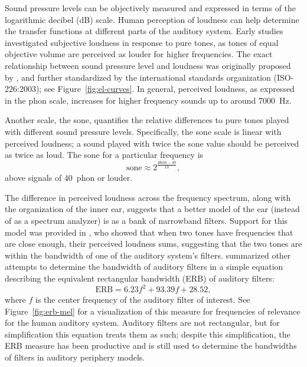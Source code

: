 Sound pressure levels can be objectively measured
and expressed in terms of the logarithmic
decibel (dB) scale.
Human perception of loudness can help
determine the transfer functions
at different parts of the auditory system.
Early studies investigated
subjective loudness in response
to pure tones,
as tones of equal objective volume
are perceived as louder for higher frequencies.
The exact relationship between
sound pressure level and
loudness was originally proposed
by \citet{fletcher1933},
and further standardized
by the international standards organization
(ISO-226:2003);
see Figure~\ref{fig:el-curves}.
In general, perceived loudness,
as expressed in the phon scale,
increases for higher frequency sounds
up to around 7000~Hz.


Another scale, the sone,
quantifies the relative differences
to pure tones played with
different sound pressure levels.
Specifically, the sone scale
is linear with perceived loudness;
a sound played with twice the sone value
should be perceived as twice as loud.
The sone for a particular frequency is
\begin{equation*}
  \text{sone} \approx 2^{\frac{\text{phon} - 40}{10}},
\end{equation*}
above signals of 40~phon or louder.

The difference in perceived loudness
across the frequency spectrum,
along with the organization
of the inner ear,
suggests that a better model
of the ear (instead of as a spectrum analyzer)
is as a bank of narrowband filters.
Support for this model was provided
in \citet{zwicker1957},
who showed that when two tones
have frequencies that are close enough,
their perceived loudness sums,
suggesting that the two tones
are within the bandwidth of one of the
auditory system's filters.
\citet{moore1983}
summarized other attempts to
determine the bandwidth
of auditory filters
in a simple equation
describing the equivalent
rectangular bandwidth (ERB)
of auditory filters:
\begin{equation}
  \text{ERB} = 6.23 f^2 + 93.39 f + 28.52,
\end{equation}
where $f$ is the center frequency
of the auditory filter of interest.
See Figure~\ref{fig:erb-mel} for a visualization of
this measure for frequencies of relevance
for the human auditory system.
Auditory filters are not rectangular,
but for simplification this equation
treats them as such;
despite this simplification,
the ERB measure has been productive and is still used
to determine the bandwidths
of filters in auditory periphery models.

